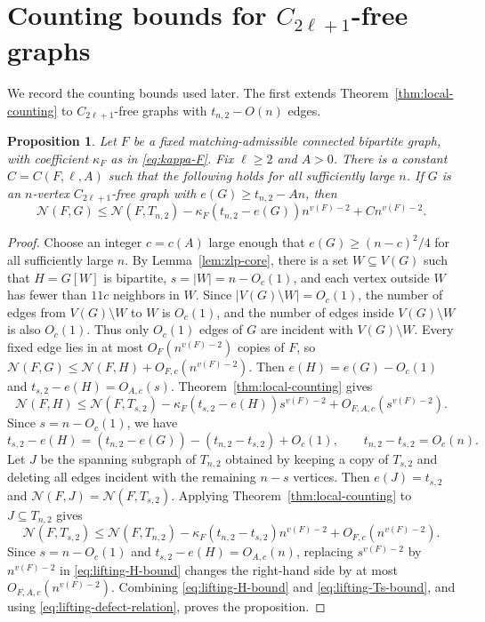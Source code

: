 \documentclass[11pt]{article}
\newtheorem{proposition}[theorem]{Proposition}
\theoremstyle{definition}
\theoremstyle{plain}
\theoremstyle{remark}
\theoremstyle{plain}
\numberwithin{equation}{section}
\newcommand{\N}{\mathcal N}
\begin{document}
\section{Counting bounds for \texorpdfstring{$C_{2\ell+1}$}{C2l+1}-free graphs}\label{sec:counting-bounds}

We record the counting bounds used later. The first extends Theorem~\ref{thm:local-counting} to $C_{2\ell+1}$-free graphs with $t_{n,2}-O(n)$ edges.

\begin{proposition}\label{prop:lifting}
Let $F$ be a fixed matching-admissible connected bipartite graph, with coefficient $\kappa_F$ as in \eqref{eq:kappa-F}. Fix $\ell\ge2$ and $A>0$. There is a constant $C=C(F,\ell,A)$ such that the following holds for all sufficiently large $n$. If $G$ is an $n$-vertex $C_{2\ell+1}$-free graph with $e(G)\ge t_{n,2}-An$, then
\[
        \N(F,G)\le \N(F,T_{n,2})-
        \kappa_F(t_{n,2}-e(G))n^{v(F)-2}+Cn^{v(F)-2}.
\]
\end{proposition}

\begin{proof}
Choose an integer $c=c(A)$ large enough that $e(G)\ge(n-c)^2/4$ for all sufficiently large $n$. By Lemma~\ref{lem:zlp-core}, there is a set $W\subseteq V(G)$ such that $H=G[W]$ is bipartite, $s=|W|=n-O_c(1)$, and each vertex outside $W$ has fewer than $11c$ neighbors in $W$. Since $|V(G)\setminus W|=O_c(1)$, the number of edges from $V(G)\setminus W$ to $W$ is $O_c(1)$, and the number of edges inside $V(G)\setminus W$ is also $O_c(1)$. Thus only $O_c(1)$ edges of $G$ are incident with $V(G)\setminus W$. Every fixed edge lies in at most $O_F(n^{v(F)-2})$ copies of $F$, so $\N(F,G)\le \N(F,H)+O_{F,c}(n^{v(F)-2})$.
Then $e(H)=e(G)-O_c(1)$ and $t_{s,2}-e(H)=O_{A,c}(s)$. Theorem~\ref{thm:local-counting} gives
\begin{equation}\label{eq:lifting-H-bound}
        \N(F,H)\le \N(F,T_{s,2})-
        \kappa_F(t_{s,2}-e(H))s^{v(F)-2}+O_{F,A,c}(s^{v(F)-2}).
\end{equation}
Since $s=n-O_c(1)$, we have
\begin{equation}\label{eq:lifting-defect-relation}
        t_{s,2}-e(H)=(t_{n,2}-e(G))-(t_{n,2}-t_{s,2})+O_c(1),
        \qquad t_{n,2}-t_{s,2}=O_c(n).
\end{equation}
Let $J$ be the spanning subgraph of $T_{n,2}$ obtained by keeping a copy of $T_{s,2}$ and deleting all edges incident with the remaining $n-s$ vertices. Then $e(J)=t_{s,2}$ and $\N(F,J)=\N(F,T_{s,2})$. Applying Theorem~\ref{thm:local-counting} to $J\subseteq T_{n,2}$ gives
\begin{equation}\label{eq:lifting-Ts-bound}
        \N(F,T_{s,2})\le \N(F,T_{n,2})-
        \kappa_F(t_{n,2}-t_{s,2})n^{v(F)-2}+O_{F,c}(n^{v(F)-2}).
\end{equation}
Since $s=n-O_c(1)$ and $t_{s,2}-e(H)=O_{A,c}(n)$, replacing $s^{v(F)-2}$ by $n^{v(F)-2}$ in \eqref{eq:lifting-H-bound} changes the right-hand side by at most $O_{F,A,c}(n^{v(F)-2})$. Combining \eqref{eq:lifting-H-bound} and \eqref{eq:lifting-Ts-bound}, and using \eqref{eq:lifting-defect-relation}, proves the proposition.
\end{proof}
\end{document}
